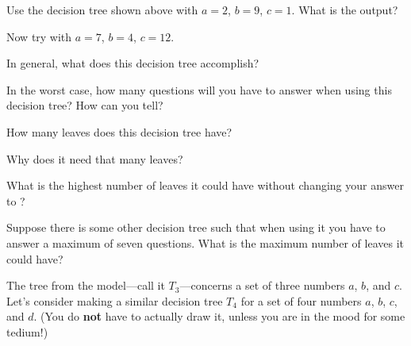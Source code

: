 \documentclass{tufte-handout}
\begin{document}
\begin{questions}
\item Use the decision tree shown above with $a = 2$, $b = 9$,
  $c = 1$.  What is the output?
\item Now try with $a = 7$, $b = 4$, $c = 12$.
\item In general, what does this decision tree accomplish?
\item \label{q:height} In the worst case, how many questions will you
  have to answer when using this decision tree?  How can you tell?
\item How many leaves does this decision tree have?
\item Why does it need that many leaves?
\item What is the highest number of leaves it could have without changing
  your answer to ?
\item Suppose there is some other decision tree such that when using
  it you have to answer a maximum of seven questions.  What is the
  maximum number of leaves it could have?
\end{questions}

The tree from the model---call it $T_3$---concerns a set of three
numbers $a$, $b$, and $c$. Let's consider making a similar decision
tree $T_4$ for a set of four numbers $a$, $b$, $c$, and $d$.  (You do
\textbf{not} have to actually draw it, unless you are in the mood for
some tedium!)
\end{document}
